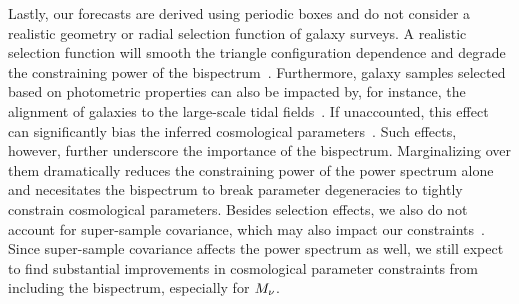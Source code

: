 Lastly, our forecasts are derived using periodic boxes and do not consider a
realistic geometry or radial selection function of galaxy surveys. A realistic 
selection function will smooth the triangle configuration dependence and degrade 
the constraining power of the bispectrum~\citep{sefusatti2005}. Furthermore, galaxy 
samples selected based on photometric properties can also be impacted by, for instance, 
the alignment of galaxies to the large-scale tidal fields~\citep{hirata2009,
krause2011, martens2018, obuljen2019}. If unaccounted, this effect can
significantly bias the inferred cosmological parameters~\citep{agarwal2020}. 
Such effects, however, further underscore the importance of the bispectrum.
Marginalizing over them dramatically reduces the constraining power of the
power spectrum alone and necesitates the bispectrum to break parameter
degeneracies to tightly constrain cosmological parameters. Besides selection
effects, we also do not account for super-sample covariance, which may also impact 
our constraints~\citep{hamilton2006, sefusatti2006, takada2013, li2018,
wadekar2019}. Since super-sample covariance affects the power spectrum as well, 
we still expect to find substantial improvements in cosmological parameter 
constraints from including the bispectrum, especially for $M_\nu$. 


